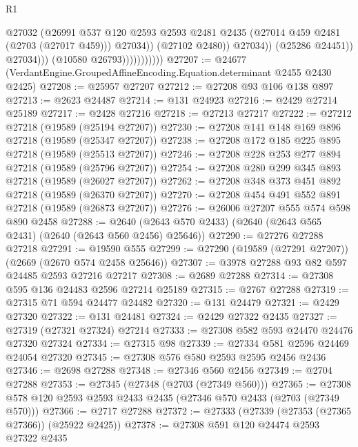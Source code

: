 \begin{lexlean}{R1}
\begin{coremodule}
                                        @27032
                                        (@26991
                                          @537
                                          @120
                                          @2593
                                          @2593
                                          @2481
                                          @2435
                                          (@27014 @459 @2481 (@2703 (@27017 @459)))
                                          @27034))
                                      (@27102 @2480))
                                    @27034))
                                (@25286 @24451))
                              @27034)))
                        (@10580 @26793)))))))))))
@27207 := @24677 (VerdantEngine.GroupedAffineEncoding.Equation.determinant @2455 @2430 @2425)
@27208 := @25957 @27207
@27212 := @27208 @93 @106 @138 @897
@27213 := @2623 @24487
@27214 := @131 @24923
@27216 := @2429 @27214 @25189
@27217 := @2428 @27216
@27218 := @27213 @27217
@27222 := @27212 @27218 (@19589 (@25194 @27207))
@27230 := @27208 @141 @148 @169 @896 @27218 (@19589 (@25347 @27207))
@27238 := @27208 @172 @185 @225 @895 @27218 (@19589 (@25513 @27207))
@27246 := @27208 @228 @253 @277 @894 @27218 (@19589 (@25796 @27207))
@27254 := @27208 @280 @299 @345 @893 @27218 (@19589 (@26027 @27207))
@27262 := @27208 @348 @373 @451 @892 @27218 (@19589 (@26370 @27207))
@27270 := @27208 @454 @491 @552 @891 @27218 (@19589 (@26873 @27207))
@27276 := @26006 @27207 @555 @574 @598 @890 @2458
@27288 := @2640 (@2643 @570 @2433) (@2640 (@2643 @565 @2431) (@2640 (@2643 @560 @2456) @25646))
@27290 := @27276 @27288 @27218
@27291 := @19590 @555
@27299 := @27290 (@19589 (@27291 @27207)) (@2669 (@2670 @574 @2458 @25646))
@27307 := @3978 @27288 @93 @82 @597 @24485 @2593 @27216 @27217
@27308 := @2689 @27288
@27314 := @27308 @595 @136 @24483 @2596 @27214 @25189
@27315 := @2767 @27288
@27319 := @27315 @71 @594 @24477 @24482
@27320 := @131 @24479
@27321 := @2429 @27320
@27322 := @131 @24481
@27324 := @2429 @27322 @2435
@27327 := @27319 (@27321 @27324) @27214
@27333 := @27308 @582 @593 @24470 @24476 @27320 @27324
@27334 := @27315 @98
@27339 := @27334 @581 @2596 @24469 @24054 @27320
@27345 := @27308 @576 @580 @2593 @2595 @2456 @2436
@27346 := @2698 @27288
@27348 := @27346 @560 @2456
@27349 := @2704 @27288
@27353 := @27345 (@27348 (@2703 (@27349 @560)))
@27365 := @27308 @578 @120 @2593 @2593 @2433 @2435 (@27346 @570 @2433 (@2703 (@27349 @570)))
@27366 := @2717 @27288
@27372 := @27333 (@27339 (@27353 (@27365 @27366)) (@25922 @2425))
@27378 := @27308 @591 @120 @24474 @2593 @27322 @2435

\end{coremodule}
\end{lexlean}
